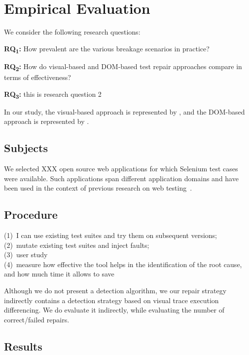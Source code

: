 
\section{Empirical Evaluation}\label{sec:evaluation}

We consider the following research questions:

\noindent
\textbf{RQ\textsubscript{1}:} How prevalent are the various breakage scenarios in practice?

\noindent
\textbf{RQ\textsubscript{2}:} How do visual-based and DOM-based test repair approaches compare in terms of effectiveness?

\noindent%
\textbf{RQ\textsubscript{3}:} this is research question 2

\noindent
In our study, the visual-based approach is represented by \tool, and the DOM-based approach is represented by \water.

\subsection{Subjects}\label{sec:subjects}

We selected XXX open source web applications for which Selenium test cases were available. Such applications span different application domains and have been used in the context of previous research on web testing~\cite{}.

\subsection{Procedure}\label{sec:procedure}

(1)~I can use existing test suites and try them on subsequent versions; \\
(2)~mutate existing test suites and inject faults; \\
(3)~user study \\
(4)~measure how effective the tool helps in the identification of the root cause, and how much time it allows to save

Although we do not present a detection algorithm, we our repair strategy indirectly contains a detection strategy based on visual trace execution differencing. We do evaluate it indirectly, while evaluating the number of correct/failed repairs.

\subsection{Results}\label{sec:results}